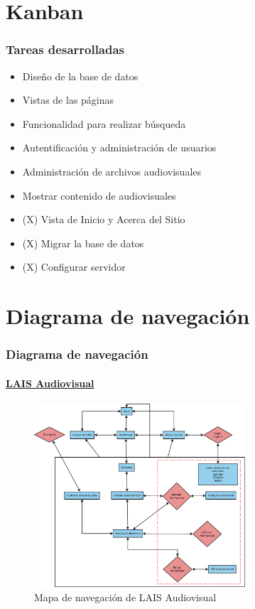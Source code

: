 \documentclass{beamer}
\begin{document}
\section{Kanban}
\begin{frame}
	\frametitle{Tareas desarrolladas}
	\begin{itemize}
		\item Diseño de la base de datos
		\item Vistas de las páginas
		\item Funcionalidad para realizar búsqueda
		\item Autentificación y administración de usuarios
		\item Administración de archivos audiovisuales
		\item Mostrar contenido de audiovisuales
		\item (X) Vista de Inicio y Acerca del Sitio		
		\item (X) Migrar la base de datos
		\item (X) Configurar servidor
	\end{itemize}
\end{frame}

\section{Diagrama de navegación}
\begin{frame}
	\frametitle{Diagrama de navegación}
	\framesubtitle{\href{http://localhost/lais-audiovisual/public/}{LAIS Audiovisual}}	
	\begin{figure}[H]
		\centering
		\includegraphics[width=0.7\textwidth]{navegacion.png} %
		\caption{Mapa de navegación de LAIS Audiovisual}
		\label{fig:esquema_general}
	\end{figure}
\end{frame}
\end{document}
